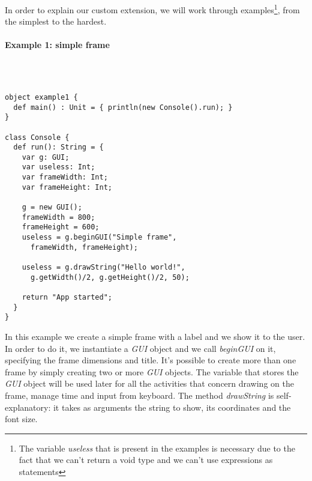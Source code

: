In order to explain our custom extension, we will work through examples\footnote{The variable \textit{useless} that is present in the examples is necessary due to the fact that we can't return a void type and we can't use expressions as statements}, from the simplest to the hardest.

\paragraph{Example 1: simple frame}\mbox{}\\
\begin{lstlisting}

object example1 {
  def main() : Unit = { println(new Console().run); }
}

class Console {
  def run(): String = {
    var g: GUI;
    var useless: Int;
    var frameWidth: Int;
    var frameHeight: Int;
    
    g = new GUI();
    frameWidth = 800;
    frameHeight = 600;
    useless = g.beginGUI("Simple frame",
      frameWidth, frameHeight);
      
    useless = g.drawString("Hello world!",
      g.getWidth()/2, g.getHeight()/2, 50);
    
    return "App started";
  }
}
\end{lstlisting}

In this example we create a simple frame with a label and we show it to the user.
In order to do it, we instantiate a \textit{GUI} object and we call \textit{beginGUI} on it, specifying the frame dimensions and title. 
It's possible to create more than one frame by simply creating two or more \textit{GUI} objects.
The variable that stores the \textit{GUI} object will be used later for all the activities that concern drawing on the frame, manage time and input from keyboard.
The method \textit{drawString} is self-explanatory: it takes as arguments the string to show, its coordinates and the font size.

